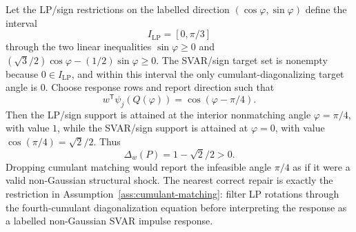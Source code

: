 \documentclass[11pt]{article}
\newcommand{\transpose}{\mathsf{T}}
\theoremstyle{definition}
\theoremstyle{plain}
\theoremstyle{remark}
\begin{document}
Let the LP/sign restrictions on the labelled direction
\((\cos\varphi,\sin\varphi)\) define the interval
\[
I_{\mathrm{LP}}=[0,\pi/3]
\]
through the two linear inequalities
\(\sin\varphi\ge0\) and
\((\sqrt3/2)\cos\varphi-(1/2)\sin\varphi\ge0\).  The SVAR/sign target set is
nonempty because \(0\in I_{\mathrm{LP}}\), and within this interval the only
cumulant-diagonalizing target angle is \(0\).  Choose response rows and report
direction such that
\[
w^\transpose\psi_j(Q(\varphi))
=\cos(\varphi-\pi/4).
\]
Then the LP/sign support is attained at the interior nonmatching angle
\(\varphi=\pi/4\), with value \(1\), while the SVAR/sign support is attained at
\(\varphi=0\), with value \(\cos(\pi/4)=\sqrt2/2\).  Thus
\[
\Delta_w(P)=1-\sqrt2/2>0.
\]
Dropping cumulant matching would report the infeasible angle \(\pi/4\) as if
it were a valid non-Gaussian structural shock.  The nearest correct repair is
exactly the restriction in Assumption~\ref{ass:cumulant-matching}: filter LP
rotations through the fourth-cumulant diagonalization equation before
interpreting the response as a labelled non-Gaussian SVAR impulse response.
\end{document}
